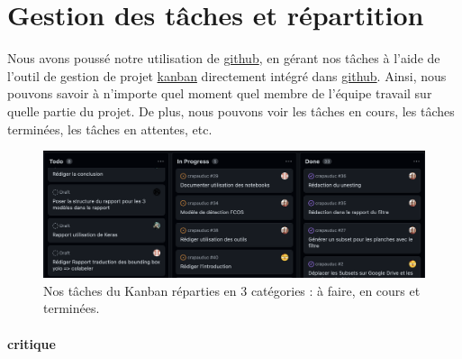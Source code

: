 \section{Gestion des tâches et répartition}
Nous avons poussé notre utilisation de \href{https://github.com}{github}, en gérant nos tâches à l'aide de l'outil de gestion de projet \href{https://github.com/topics/kanban}{kanban} directement intégré dans \href{https://github.com}{github}. Ainsi, nous pouvons savoir à n'importe quel moment quel membre de l'équipe travail sur quelle partie du projet. De plus, nous pouvons voir les tâches en cours, les tâches terminées, les tâches en attentes, etc. 

\begin{figure}[htb!]
    \centering
    \includegraphics[width=0.8\linewidth]{images/kanban.png}
    \caption{Nos tâches du Kanban réparties en 3 catégories : à faire, en cours et terminées.}
    \label{fig:kanban}
\end{figure}

\paragraph{critique}